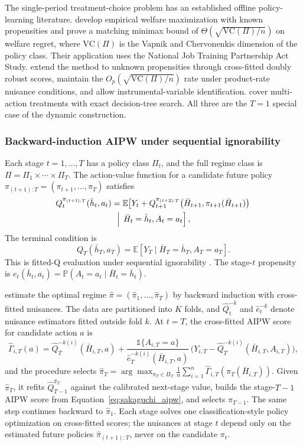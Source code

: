 The single-period treatment-choice problem has an established offline policy-learning literature. \citet{kitagawa2018who} develop empirical welfare maximization with known propensities and prove a matching minimax bound of $\Theta(\sqrt{\mathrm{VC}(\Pi)/n})$ on welfare regret, where $\mathrm{VC}(\Pi)$ is the Vapnik and Chervonenkis dimension of the policy class. Their application uses the National Job Training Partnership Act Study. \citet{athey2021policy} extend the method to unknown propensities through cross-fitted doubly robust scores, maintain the $O_p(\sqrt{\mathrm{VC}(\Pi)/n})$ rate under product-rate nuisance conditions, and allow instrumental-variable identification. \citet{zhou2023offline} cover multi-action treatments with exact decision-tree search. All three are the $T=1$ special case of the dynamic construction.

\subsubsection*{Backward-induction AIPW under sequential ignorability}

Each stage $t = 1, \ldots, T$ has a policy class $\Pi_t$, and the full regime class is $\Pi = \Pi_1 \times \cdots \times \Pi_T$. The action-value function for a candidate future policy $\pi_{(t+1):T} = (\pi_{t+1}, \ldots, \pi_T)$ satisfies
\begin{multline}
Q^{\pi_{(t+1):T}}_t(\bar h_t,a_t)
=\mathbb{E}\!\left[
Y_t+Q^{\pi_{(t+2):T}}_{t+1}
\bigl(\bar H_{t+1},\pi_{t+1}(\bar H_{t+1})\bigr)
\right.\\
\left.
\Bigm|\,\bar H_t=\bar h_t,A_t=a_t
\right],
\label{eq:sakaguchi_q}
\end{multline}
The terminal condition is
\[
Q_T(\bar h_T,a_T)
=\mathbb E[Y_T\mid\bar H_T=\bar h_T,A_T=a_T].
\]
This is fitted-Q evaluation under sequential ignorability \citep{sakaguchi2024dynamicpolicy}. The stage-$t$ propensity is $e_t(\bar h_t,a_t)=\mathbb P(A_t=a_t\mid\bar H_t=\bar h_t)$.

\citet{sakaguchi2024dynamicpolicy} estimate the optimal regime $\hat\pi = (\hat\pi_1, \ldots, \hat\pi_T)$ by backward induction with cross-fitted nuisances. The data are partitioned into $K$ folds, and $\hat Q^{-k}_t$ and $\hat e^{-k}_t$ denote nuisance estimators fitted outside fold $k$. At $t=T$, the cross-fitted AIPW score for candidate action $a$ is
\begin{equation}
\hat\Gamma_{i, T}(a) = \hat Q^{-k(i)}_T(\bar H_{i,T}, a) + \frac{\mathbb 1\{A_{i,T} = a\}}{\hat e^{-k(i)}_T(\bar H_{i,T}, a)}\,\bigl(Y_{i,T} - \hat Q^{-k(i)}_T(\bar H_{i,T}, A_{i,T})\bigr),
\label{eq:sakaguchi_aipw}
\end{equation}
and the procedure selects $\hat\pi_T = \arg\max_{\pi_T \in \Pi_T} \tfrac{1}{n}\sum_{i=1}^n \hat\Gamma_{i,T}(\pi_T(\bar H_{i,T}))$. Given $\hat\pi_T$, it refits $\hat Q^{\hat\pi_T}_{T-1}$ against the calibrated next-stage value, builds the stage-$T{-}1$ AIPW score from Equation~\eqref{eq:sakaguchi_aipw}, and selects $\hat\pi_{T-1}$. The same step continues backward to $\hat\pi_1$. Each stage solves one classification-style policy optimization on cross-fitted scores; the nuisances at stage $t$ depend only on the estimated future policies $\hat\pi_{(t+1):T}$, never on the candidate $\pi_t$.

